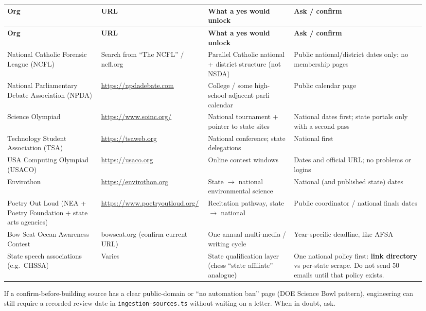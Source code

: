 \documentclass[11pt]{article}
\begin{document}
{\small
\begin{longtable}{@{}L{0.22\textwidth} L{0.22\textwidth} L{0.26\textwidth} L{0.22\textwidth}@{}}
\toprule
\textbf{Org} & \textbf{URL} & \textbf{What a yes would unlock} & \textbf{Ask / confirm} \\
\midrule
\endfirsthead
\toprule
\textbf{Org} & \textbf{URL} & \textbf{What a yes would unlock} & \textbf{Ask / confirm} \\
\midrule
\endhead
\bottomrule
\endlastfoot
National Catholic Forensic League (NCFL)
  & Search from ``The NCFL'' / ncfl.org
  & Parallel Catholic national + district structure (not NSDA)
  & Public national/district dates only; no membership pages \\[0.45em]
National Parliamentary Debate Association (NPDA)
  & \url{https://npdadebate.com}
  & College / some high-school-adjacent parli calendar
  & Public calendar page \\[0.45em]
Science Olympiad
  & \url{https://www.soinc.org/}
  & National tournament + pointer to state sites
  & National dates first; state portals only with a second pass \\[0.45em]
Technology Student Association (TSA)
  & \url{https://tsaweb.org}
  & National conference; state delegations
  & National first \\[0.45em]
USA Computing Olympiad (USACO)
  & \url{https://usaco.org}
  & Online contest windows
  & Dates and official URL; no problems or logins \\[0.45em]
Envirothon
  & \url{https://envirothon.org}
  & State $\rightarrow$ national environmental science
  & National (and published state) dates \\[0.45em]
Poetry Out Loud (NEA + Poetry Foundation + state arts agencies)
  & \url{https://www.poetryoutloud.org/}
  & Recitation pathway, state $\rightarrow$ national
  & Public coordinator / national finals dates \\[0.45em]
Bow Seat Ocean Awareness Contest
  & bowseat.org (confirm current URL)
  & One annual multi-media / writing cycle
  & Year-specific deadline, like AFSA \\[0.45em]
State speech associations (e.g.\ CHSSA)
  & Varies
  & State qualification layer (chess ``state affiliate'' analogue)
  & One national policy first: \textbf{link directory} vs per-state scrape. Do not send 50 emails until that policy exists. \\
\end{longtable}
}

If a confirm-before-building source has a clear public-domain or ``no automation ban'' page (DOE Science Bowl pattern), engineering can still require a recorded review date in \texttt{ingestion-sources.ts} without waiting on a letter. When in doubt, ask.
\end{document}
